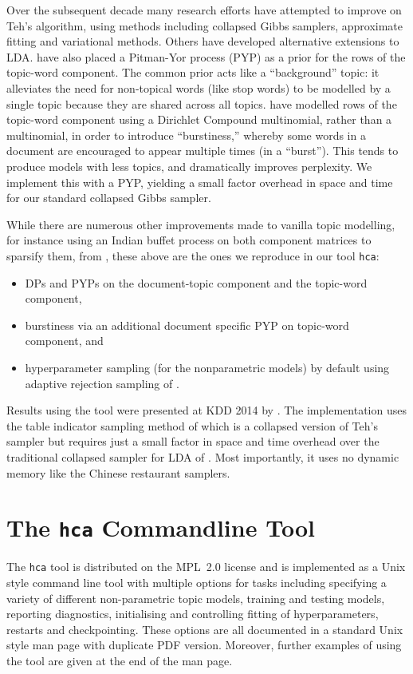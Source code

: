 \documentclass[twoside,11pt]{article}
\begin{document}
Over the subsequent decade many
research efforts have attempted to improve on Teh's algorithm,
using methods including collapsed Gibbs
samplers, approximate fitting and variational methods.
Others have developed alternative extensions to LDA.
\cite{Sato:2010} have also placed a Pitman-Yor process (PYP) as a prior
for the rows of the topic-word component.
The common prior acts like a ``background'' topic: it alleviates the need
for non-topical words (like stop words)
to be modelled by a single topic because they are
shared across all topics.
\cite{Doyle:2009} have modelled rows of the topic-word component using
a Dirichlet Compound multinomial, rather than a multinomial,
in order to introduce ``burstiness,'' whereby some words in
a document are encouraged to appear multiple times (in a ``burst'').
This tends to produce models with less topics,
and dramatically improves perplexity.
We implement this with a PYP, yielding a small factor overhead
in space and time for our standard collapsed Gibbs sampler.

While there are numerous other improvements made to vanilla topic
modelling,
for instance using an Indian buffet process on both
component matrices to sparsify them, from \cite{archambeau2015latent},
these above are the ones we reproduce in our tool {\tt hca}:
\begin{itemize}
\item
  DPs and PYPs on the document-topic component and the topic-word component,
\item
  burstiness via an additional document specific PYP on
  topic-word component, and
\item
  hyperparameter sampling (for the nonparametric models)
  by default using adaptive rejection sampling of
  \cite{gilks1992adaptive}.
\end{itemize}
Results using the tool were presented at KDD 2014 by
\cite{buntinemishra14}.
The implementation uses the table indicator sampling method of
\cite{chen2011sampling} which is a collapsed version of
Teh's sampler but requires just a small factor in
space and time overhead over the traditional
collapsed sampler for LDA of \cite{griffiths2004finding}.
Most importantly, it uses no dynamic memory like the Chinese restaurant
samplers.

\section{The {\tt hca} Commandline Tool}

The {\tt hca} tool is distributed on the MPL~2.0 license
and is implemented as a Unix style command line tool
with multiple options for tasks including
specifying a variety of different non-parametric topic models,
training and testing models,
reporting diagnostics, initialising and controlling fitting of
hyperparameters, restarts and checkpointing.
These options are all documented in a standard Unix style man page with
duplicate PDF version.  Moreover, further examples of using the tool
are given at the end of the man page.
\end{document}
